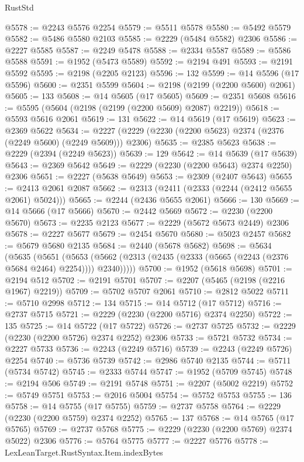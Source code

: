 \begin{lexlean}{RustStd}
\begin{coremodule}
@5578 := @2243 @5576 @2254
@5579 := @5511 @5578
@5580 := @5492 @5579
@5582 := @5486 @5580 @2103
@5585 := @2229 (@5484 @5582) @2306
@5586 := @2227 @5585
@5587 := @2249 @5478
@5588 := @2334 @5587
@5589 := @5586 @5588
@5591 := @1952 (@5473 @5589)
@5592 := @2194 @491
@5593 := @2191 @5592
@5595 := @2198 (@2205 @2123)
@5596 := 132
@5599 := @14 @5596 (@17 @5596)
@5600 := @2351 @5599
@5604 := @2198 (@2199 (@2200 @5600) @2061)
@5605 := 133
@5608 := @14 @5605 (@17 @5605)
@5609 := @2351 @5608
@5616 := @5595 (@5604 (@2198 (@2199 (@2200 @5609) @2087) @2219))
@5618 := @5593 @5616 @2061
@5619 := 131
@5622 := @14 @5619 (@17 @5619)
@5623 := @2369 @5622
@5634 := @2227 (@2229 (@2230 (@2200 @5623) @2374 (@2376 (@2249 @5600) (@2249 @5609))) @2306)
@5635 := @2385 @5623
@5638 := @2229 (@2394 (@2249 @5623))
@5639 := 129
@5642 := @14 @5639 (@17 @5639)
@5643 := @2369 @5642
@5649 := @2229 (@2230 (@2200 @5643) @2374 @2250) @2306
@5651 := @2227 (@5638 @5649)
@5653 := @2309 (@2407 @5643)
@5655 := @2413 @2061 @2087
@5662 := @2313 (@2411 (@2333 (@2244 (@2412 @5655 @2061) @5024)))
@5665 := @2244 (@2436 @5655 @2061)
@5666 := 130
@5669 := @14 @5666 (@17 @5666)
@5670 := @2442 @5669
@5672 := @2230 (@2200 @5670)
@5673 := @2235 @2123
@5677 := @2229 (@5672 @5673 @2449) @2306
@5678 := @2227 @5677
@5679 := @2454 @5670
@5680 := @5023 @2457
@5682 := @5679 @5680 @2135
@5684 := @2440 (@5678 @5682)
@5698 := @5634
    (@5635
      (@5651
        (@5653 (@5662 (@2313 (@2435 (@2333 (@5665 (@2243 (@2376 @5684 @2464) @2254)))) @2340)))))
@5700 := @1952 (@5618 @5698)
@5701 := @2194 @512
@5702 := @2191 @5701
@5707 := @2207 (@5465 (@2198 (@2216 @1967) @2219))
@5709 := @5702 @5707 @2061
@5710 := @2812 @5022
@5711 := @5710 @2998
@5712 := 134
@5715 := @14 @5712 (@17 @5712)
@5716 := @2737 @5715
@5721 := @2229 (@2230 (@2200 @5716) @2374 @2250)
@5722 := 135
@5725 := @14 @5722 (@17 @5722)
@5726 := @2737 @5725
@5732 := @2229 (@2230 (@2200 @5726) @2374 @2252) @2306
@5733 := @5721 @5732
@5734 := @2227 @5733
@5736 := @2243 (@2249 @5716)
@5739 := @2243 (@2249 @5726) @2254
@5740 := @5736 @5739
@5742 := @2986 @5740 @2135
@5744 := @5711 (@5734 @5742)
@5745 := @2333 @5744
@5747 := @1952 (@5709 @5745)
@5748 := @2194 @506
@5749 := @2191 @5748
@5751 := @2207 (@5002 @2219)
@5752 := @5749 @5751
@5753 := @2016 @5004
@5754 := @5752 @5753
@5755 := 136
@5758 := @14 @5755 (@17 @5755)
@5759 := @2737 @5758
@5764 := @2229 (@2230 (@2200 @5759) @2374 @2252)
@5765 := 137
@5768 := @14 @5765 (@17 @5765)
@5769 := @2737 @5768
@5775 := @2229 (@2230 (@2200 @5769) @2374 @5022) @2306
@5776 := @5764 @5775
@5777 := @2227 @5776
@5778 := LexLeanTarget.RustSyntax.Item.indexBytes

\end{coremodule}
\end{lexlean}
